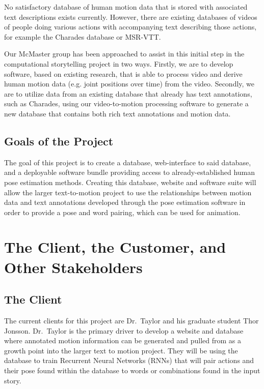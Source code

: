 \documentclass{scrreprt}
\begin{document}
No satisfactory database of human motion data that is stored with associated
text descriptions exists currently. However, there are existing databases of
videos of people doing various actions with accompanying text describing those
actions, for example the Charades database or MSR-VTT.

Our McMaster group has been approached to assist in this initial step in the
computational storytelling project in two ways.  Firstly, we are to develop
software, based on existing research, that is able to process video and derive
human motion data (e.g. joint positions over time) from the video. Secondly, we
are to utilize data from an existing database that already has text
annotations, such as Charades, using our video-to-motion processing software to
generate a new database that contains both rich text annotations and motion data.

\subsection{Goals of the Project}

The goal of this project is to create a database, web-interface to said
database, and a deployable software bundle providing access to
already-established human pose estimation methods. Creating this database,
website and software suite will allow the larger text-to-motion project to use
the relationships between motion data and text annotations developed through
the pose estimation software in order to provide a pose and word pairing, which
can be used for animation.

\section{The Client, the Customer, and Other Stakeholders}

\subsection{The Client}

The current clients for this project are Dr.\ Taylor and his graduate student
Thor Jonsson. Dr.\ Taylor is the primary driver to develop a website and
database where annotated motion information can be generated and pulled from as
a growth point into the larger text to motion project. They will be using the
database to train Recurrent Neural Networks (RNNs) that will pair actions and
their pose found within the database to words or combinations found in the
input story.
\end{document}

